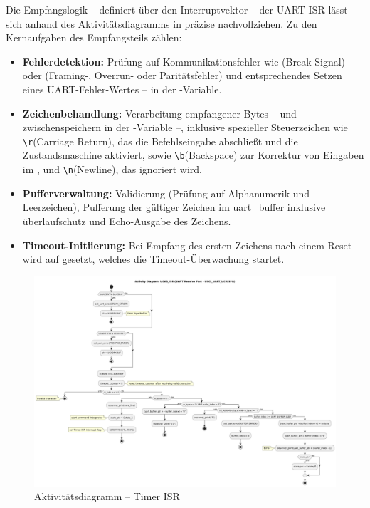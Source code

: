 Die Empfangslogik -- definiert \"uber den Interruptvektor  -- der UART-ISR l\"asst sich anhand des Aktivit\"atsdiagramms in  pr\"azise nachvollziehen. Zu den Kernaufgaben des Empfangsteils z\"ahlen:

\begin{itemize}
	\item \textbf{Fehlerdetektion:} Pr\"ufung auf Kommunikationsfehler wie  (Break-Signal) oder  (Framing-, Overrun- oder Parit\"atsfehler) und entsprechendes Setzen eines UART-Fehler-Wertes -- in der -Variable. 
	
	\item \textbf{Zeichenbehandlung:} Verarbeitung empfangener Bytes -- und zwischenspeichern in der -Variable --, inklusive spezieller Steuerzeichen wie \grqq \texttt{\textbackslash r}\grqq (Carriage Return), das die Befehlseingabe abschließt und die Zustandsmaschine aktiviert, sowie \grqq \texttt{\textbackslash b}\grqq (Backspace) zur Korrektur von Eingaben im , und \grqq \texttt{\textbackslash n}\grqq (Newline), das ignoriert wird.

	\item \textbf{Pufferverwaltung:} Validierung (Pr\"ufung auf Alphanumerik und Leerzeichen), Pufferung der g\"ultiger Zeichen im uart\_buffer inklusive \"uberlaufschutz und Echo-Ausgabe des Zeichens.

	\item \textbf{Timeout-Initiierung:} Bei Empfang des ersten Zeichens nach einem Reset wird  auf  gesetzt, welches die Timeout-\"Uberwachung startet.
\end{itemize}

\begin{figure}[h!]
	\centering
	\includegraphics[width=1.0\textwidth]{../Bilder/observer_activity_diagram_eusci_receive.png}
	\caption{Aktivit\"atsdiagramm -- Timer ISR}
	\label{fig:activity_diagram_uart_isr_rec}
\end{figure}

